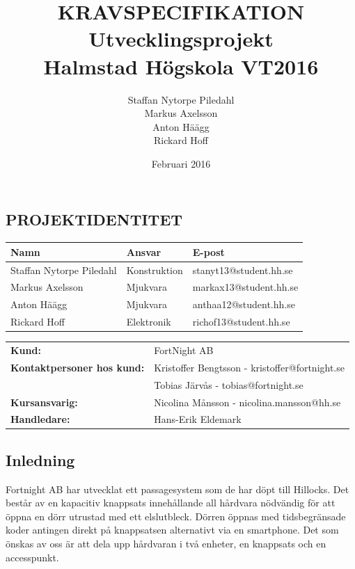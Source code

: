 \documentclass[twocolumn]{article}
\title{\textbf{KRAVSPECIFIKATION}\\
    \large Utvecklingsprojekt \\
    Halmstad Högskola VT2016}
\author{
Staffan  Nytorpe Piledahl\\
Markus Axelsson\\
Anton Häägg\\
Rickard Hoff}
\date{Februari 2016}
\newcounter{mycounter}
\begin{document}
\setcounter{mycounter}{1}

\onecolumn

\maketitle
\thispagestyle{empty}
\newpage
\begin{center}
\chapter{\textbf{\LARGE PROJEKTIDENTITET}}
\end{center}
\vspace{30mm}
\begin{center}
\begin{tabularx}{\textwidth}{| X | X | X |} 
 \hline
 \textbf{Namn} & \textbf{Ansvar} & \textbf{E-post} \\ 
 \hline
 Staffan Nytorpe Piledahl & Konstruktion & stanyt13@student.hh.se\\ 
 Markus Axelsson & Mjukvara & markax13@student.hh.se\\
 Anton Häägg & Mjukvara & anthaa12@student.hh.se\\
 Rickard Hoff & Elektronik & richof13@student.hh.se\\
 \hline
\end{tabularx}

\end{center}
  \begin{tabular}{@{}ll@{}}
    \vspace{2mm}
    \textbf{Kund:} & FortNight AB\\
    \textbf{Kontaktpersoner hos kund:} & Kristoffer Bengtsson - kristoffer@fortnight.se\\
    \vspace{2mm}
    & Tobias Järvås - tobias@fortnight.se\\
    \vspace{2mm}
    \textbf{Kursansvarig:} & Nicolina Månsson - nicolina.mansson@hh.se\\
    \textbf{Handledare:} & Hans-Erik Eldemark
  \end{tabular}

\clearpage
\renewcommand{\cftsecleader}{\cftdotfill{\cftdotsep}}
\tableofcontents
\clearpage
\twocolumn
\section{Inledning}
Fortnight AB har utvecklat ett passagesystem som de har döpt till Hillocks. Det består av en kapacitiv knappsats innehållande all hårdvara nödvändig för att öppna en dörr utrustad med ett elslutbleck. Dörren öppnas med tidsbegränsade koder antingen direkt på knappsatsen alternativt via en smartphone. Det som önskas av oss är att dela upp hårdvaran i två enheter, en knappsats och en accesspunkt.
\end{document}
